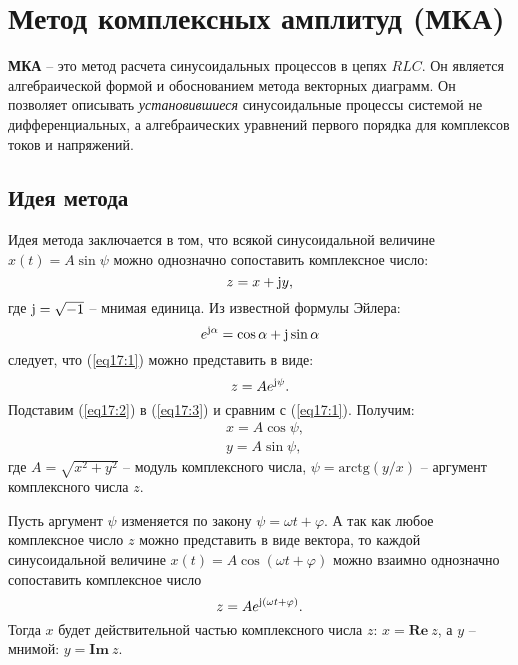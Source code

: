 \chapter{Метод комплексных амплитуд (МКА)}

    \begin{definition}
        \textbf{МКА} -- это метод расчета синусоидальных процессов в цепях
        \( RLC \). Он является алгебраической формой и обоснованием метода
        векторных диаграмм. Он позволяет описывать \textit{установившиеся}
        синусоидальные процессы системой не дифференциальных, а алгебраических
        уравнений первого порядка для комплексов токов и напряжений.
    \end{definition}
    
\section{Идея метода}

    Идея метода заключается в том, что всякой синусоидальной величине
    \( x(t) = A\sin\psi \) можно однозначно сопоставить комплексное число:
    \begin{equation}
        z = x + \mathrm{j} y,
        \label{eq17:1}
    \end{equation}
    где \( \mathrm{j} = \sqrt{-1} \) -- мнимая единица. Из известной формулы Эйлера:
    \begin{equation}
        e^{\mathrm{j}\alpha} = \cos\alpha + \mathrm{j}\sin\alpha
        \label{eq17:2}
    \end{equation}
    следует, что (\ref{eq17:1}) можно представить в виде:
    \begin{equation}
        z = Ae^{\mathrm{j}\psi}.
        \label{eq17:3}
    \end{equation}
    Подставим (\ref{eq17:2}) в (\ref{eq17:3}) и сравним с (\ref{eq17:1}).
    Получим:
    \begin{align*}
        & x = A\cos\psi, \\
        & y = A\sin\psi,
    \end{align*}
    где \( A = \sqrt{x^2 + y^2} \) -- модуль комплексного числа, 
    \( \psi = \mathrm{arctg}(y/x) \) -- аргумент комплексного числа
    \( z \).
    
    Пусть аргумент \( \psi \) изменяется по закону
    \( \psi = \omega t + \varphi \). А так как любое комплексное число \( z \)
    можно представить в виде вектора, то каждой синусоидальной величине
    \( x(t) = A\cos(\omega t + \varphi) \) можно взаимно однозначно сопоставить
    комплексное число 
    \begin{equation}
        z = Ae^{\mathrm{j}(\omega t + \varphi)}.
        \label{eq17:4}
    \end{equation}
    Тогда \( x \) будет действительной частью комплексного числа \( z \):
    \( x = \mathbf{Re\ }z \), а \( y \) -- мнимой: \( y = \mathbf{Im\ }z \).
    
